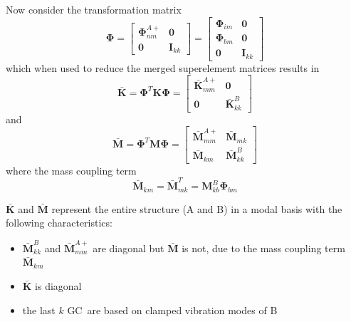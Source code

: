 \documentclass[10pt,openany,twoside]{book}
\numberwithin{equation}{section}   %
\newcommand{\Matrix}[1]{\boldsymbol{#1}}
\newcommand{\Gc}{GC}
\begin{document}
Now consider the transformation matrix
\begin{equation}
\Matrix{\Phi} = \left[
\begin{array}{cc}
   \Matrix{\Phi}_{nm}^{A+} & \Matrix{0} \\
   \Matrix{0} & \Matrix{I}_{kk}
\end{array}
\right] = \left[
\begin{array}{cc}
   \Matrix{\Phi}_{im} & \Matrix{0} \\
   \Matrix{\Phi}_{bm} & \Matrix{0} \\
   \Matrix{0} & \Matrix{I}_{kk}
\end{array}
\right]				\nonumber
\end{equation}
which when used to reduce the merged superelement matrices results in
\begin{equation}
\Matrix{\bar{K}} = \Matrix{\Phi}^T \Matrix{K} \Matrix{\Phi} = \left[
\begin{array}{cc}
   \Matrix{\bar{K}}_{mm}^{A+} & \Matrix{0} \\
   \Matrix{0} & \Matrix{\bar{K}}_{kk}^B
\end{array}
\right]			\nonumber
\end{equation}
and
\begin{displaymath}
\Matrix{\bar{M}} = \Matrix{\Phi}^T \Matrix{M} \Matrix{\Phi} = \left[
\begin{array}{cc}
   \Matrix{\bar{M}}_{mm}^{A+} & \Matrix{\bar{M}}_{mk} \\
   \Matrix{\bar{M}}_{km} & \Matrix{\bar{M}}_{kk}^B
\end{array}
\right]
\end{displaymath}
where the mass coupling term
\begin{displaymath}
\Matrix{\bar{M}}_{km} = \Matrix{\bar{M}}_{mk}^T = \Matrix{M}_{kb}^B \Matrix{\Phi}_{bm}
\end{displaymath}

$\Matrix{\bar{K}}$ and $\Matrix{\bar{M}}$ represent the entire structure
(A and B) in a modal basis with the following characteristics:
\begin{itemize}
\item $\Matrix{\bar{M}}_{kk}^B$ and $\Matrix{\bar{M}}_{mm}^{A+}$ are diagonal but
		$\Matrix{\bar{M}}$ is not, due to the mass coupling term $\Matrix{\bar{M}}_{km}$
\item $\Matrix{\bar{K}}$ is diagonal
\item the last $k$ \Gc\ are based on clamped vibration modes of B
\end{itemize}
\end{document}
